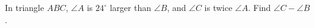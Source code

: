 In triangle $ABC$, $\angle A$ is $24^\circ$ larger than $\angle B$, and $\angle C$ is twice $\angle A$. Find $\angle C-\angle B$.
